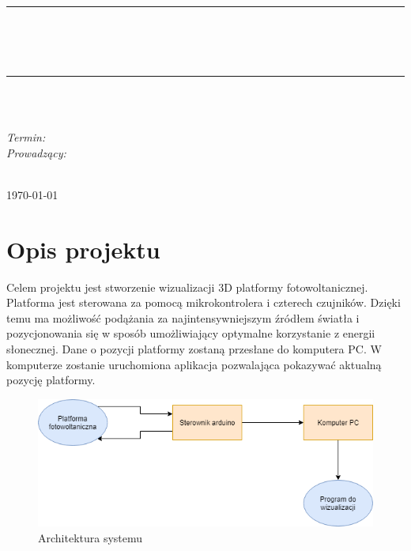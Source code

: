 \documentclass[10pt, a4paper]{article}
\begin{document}
\def\tablename{Tabela}	%

\begin{titlepage}
	\begin{center}
		\textsc{\LARGE \formakursu}\\[1cm]		
		\textsc{\Large \kurs}\\[0.5cm]		
		\rule{\textwidth}{0.08cm}\\[0.4cm]
		{\huge \bfseries \doctype}\\[1cm]
		{\huge \bfseries \projectname}\\[0.5cm]
		\rule{\textwidth}{0.08cm}\\[1cm]
		
		\begin{flushright} \large
		\osobaA\\[0.4cm]
		
		\emph{Termin: }\termin\\[0.4cm]

		\emph{Prowadzący:} \\
		\prowadzacy \\
		
		\end{flushright}
		
		\vfill
		
		{\large \today}
	\end{center}	
\end{titlepage}
\newpage
\tableofcontents
\newpage

\section{Opis projektu}
\label{sec:OpisProjektu}

Celem projektu jest stworzenie wizualizacji 3D platformy fotowoltanicznej. Platforma jest sterowana za pomocą mikrokontrolera i czterech czujników. Dzięki temu ma możliwość podążania za najintensywniejszym źródłem światła i pozycjonowania się w sposób umożliwiający optymalne korzystanie z energii słonecznej. Dane o pozycji platformy zostaną przesłane do komputera PC. W komputerze zostanie uruchomiona aplikacja pozwalająca pokazywać aktualną pozycję platformy.
\newline
\newline

\begin{figure}[H]
	\centering
	\includegraphics[width=1\textwidth]{figures/diag_uml.png}
	\caption{Architektura systemu}
	\label{fig:Architektura}
\end{figure}
\end{document}
